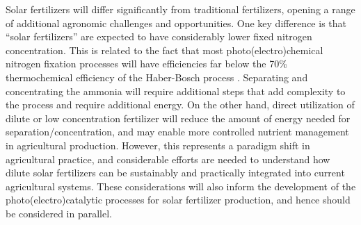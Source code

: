 Solar fertilizers will differ significantly from traditional fertilizers, opening a range of additional agronomic challenges and opportunities. One key difference is that ``solar fertilizers'' are expected to have considerably lower fixed nitrogen concentration. This is related to the fact that most photo(electro)chemical nitrogen fixation processes will have efficiencies far below the 70\% thermochemical efficiency of the Haber-Bosch process \cite{Schloegl_2003, Singh_2017}.
Separating and concentrating the ammonia will require additional steps that add complexity to the process and require additional energy. On the other hand, direct utilization of dilute or low concentration fertilizer will reduce the amount of energy needed for separation/concentration, and may enable more controlled nutrient management in agricultural production\cite{Bar_Yosef_1999,kafkafi2011fertigation}. However, this represents a paradigm shift in agricultural practice, and considerable efforts are needed to understand how dilute solar fertilizers can be sustainably and practically integrated into current agricultural systems. These considerations will also inform the development of the photo(electro)catalytic processes for solar fertilizer production, and hence should be considered in parallel.


